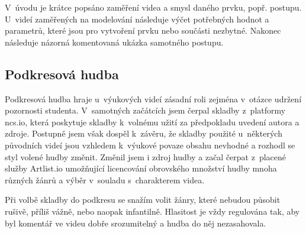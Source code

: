 V~úvodu je krátce popsáno zaměření videa a smysl daného prvku, popř. postupu.
U~videí zaměřených na modelování následuje výčet potřebných hodnot a parametrů, které jsou pro vytvoření prvku nebo součásti nezbytné.
Nakonec následuje názorná komentovaná ukázka samotného postupu.

\subsection{Podkresová hudba}
Podkresová hudba hraje u~výukových videí zásadní roli zejména v~otázce udržení pozornosti studenta.
V~samotných začátcích jsem čerpal skladby z~platformy ncs.io, která poskytuje skladby k~volnému užití za předpokladu uvedení autora a zdroje.
Postupně jsem však dospěl k~závěru, že skladby použité u~některých původních videí jsou vzhledem k~výukové povaze obsahu nevhodné a rozhodl se styl volené hudby změnit. 
Změnil jsem i zdroj hudby a začal čerpat z~placené služby Artlist.io umožňující licencování obrovského množství hudby mnoha různých žánrů a výběr v~souladu s~charakterem videa.

Při volbě skladby do podkresu se snažím volit žánry, které nebudou působit rušivě, příliš vážně, nebo naopak infantilně.
Hlasitost je vždy regulována tak, aby byl komentář ve videu dobře srozumitelný a hudba do něj nezasahovala.

